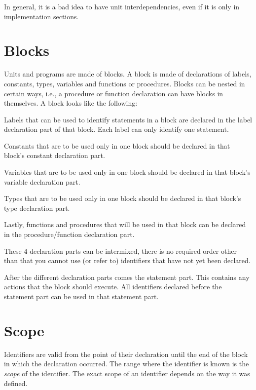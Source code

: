 In general, it is a bad idea to have unit interdependencies, even if it is
only in implementation sections.

\section{Blocks}
\label{se:blocks}
Units and programs are made of blocks. A block is made of declarations of
labels, constants, types, variables and functions or procedures. Blocks can
be nested in certain ways, i.e., a procedure or function declaration can
have blocks in themselves.
A block looks like the following:

Labels that can be used to identify statements in a block are declared in
the label declaration part of that block. Each label can only identify one
statement.

Constants that are to be used only in one block should be declared in that
block's constant declaration part.

Variables that are to be used only in one block should be declared in that
block's variable declaration part.

Types that are to be used only in one block should be declared in that
block's type declaration part.

Lastly, functions and procedures that will be used in that block can be
declared in the procedure/function declaration part.

These 4 declaration parts can be intermixed, there is no required order
other than that you cannot use (or refer to) identifiers that have not 
yet been declared.

After the different declaration parts comes the statement part. This
contains any actions that the block should execute. All identifiers 
declared before the statement part can be used in that statement part.

\section{Scope}
Identifiers are valid from the point of their declaration until the end of
the block in which the declaration occurred. The range where the identifier
is known is the {\em scope} of the identifier. The exact scope of an
identifier depends on the way it was defined.
